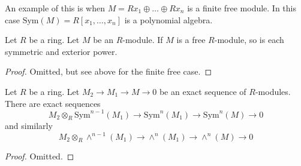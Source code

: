 \medskip\noindent
An example of this is when $M = Rx_1 \oplus \ldots \oplus Rx_n$
is a finite free module. In this case
$\text{Sym}(M) = R[x_1, \ldots, x_n]$ is a polynomial algebra.

\begin{lemma}
\label{lemma-free-tensor-algebra}
Let $R$ be a ring. Let $M$ be an $R$-module.
If $M$ is a free $R$-module, so is each symmetric and exterior power.
\end{lemma}

\begin{proof}
Omitted, but see above for the finite free case.
\end{proof}

\begin{lemma}
\label{lemma-presentation-sym-exterior}
Let $R$ be a ring.
Let $M_2 \to M_1 \to M \to 0$ be an exact sequence of $R$-modules.
There are exact sequences
$$
M_2 \otimes_R \text{Sym}^{n - 1}(M_1)
\to
\text{Sym}^n(M_1)
\to
\text{Sym}^n(M)
\to
0
$$
and similarly
$$
M_2 \otimes_R \wedge^{n - 1}(M_1)
\to
\wedge^n(M_1)
\to
\wedge^n(M)
\to
0
$$
\end{lemma}

\begin{proof}
Omitted.
\end{proof}

